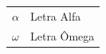 \begin{tabular}{p{2.5cm}p{14.5cm}}
     $\alpha$       & Letra Alfa  \\
     $\omega$       & Letra Ômega 
\end{tabular}